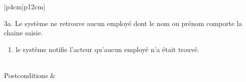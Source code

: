\begin{longtable}{|p{4cm}|p{12cm}|}
                    \begin{minipage}[t]{\linewidth}
                        3a. Le système ne retrouve aucun employé dont le nom ou prénom comporte la chaine saisie.   \begin{enumerate}[nosep,after=\strut]
                              \item le système notifie l'acteur qu’aucun employé n'a \linebreak était  trouvé.
                        \end{enumerate}
                    \end{minipage}
                    \\
                    \hline
                    Postconditions &   \\
                    \hline
                \caption{Description du cas d'utilisation « Rechercher employé »}\\
            \end{longtable}        

